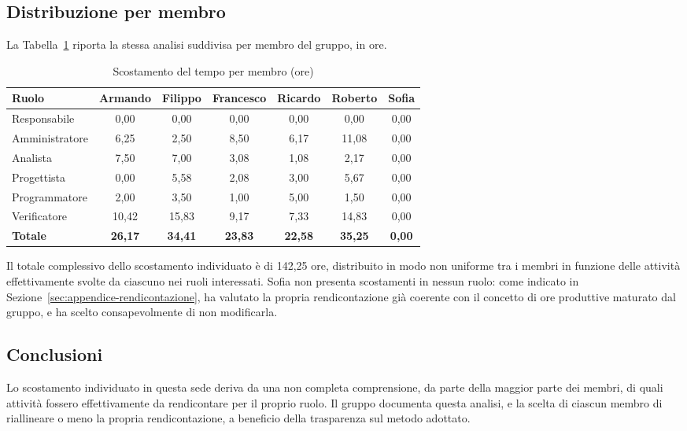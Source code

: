 \subsection{Distribuzione per membro}

La Tabella~\ref{tab:appendice-delta-membro} riporta la stessa analisi
suddivisa per membro del gruppo, in ore.

\begin{table}[H]
\centering
\renewcommand{\arraystretch}{1.3}
\begin{tabularx}{\textwidth}{|X|c|c|c|c|c|c|}
\hline
\textbf{Ruolo} & \textbf{Armando} & \textbf{Filippo} & \textbf{Francesco} & \textbf{Ricardo} & \textbf{Roberto} & \textbf{Sofia} \\
\hline
Responsabile   & 0{,}00 & 0{,}00 & 0{,}00 & 0{,}00 & 0{,}00 & 0{,}00 \\
Amministratore & 6{,}25 & 2{,}50 & 8{,}50 & 6{,}17 & 11{,}08 & 0{,}00 \\
Analista       & 7{,}50 & 7{,}00 & 3{,}08 & 1{,}08 & 2{,}17 & 0{,}00 \\
Progettista    & 0{,}00 & 5{,}58 & 2{,}08 & 3{,}00 & 5{,}67 & 0{,}00 \\
Programmatore  & 2{,}00 & 3{,}50 & 1{,}00 & 5{,}00 & 1{,}50 & 0{,}00 \\
Verificatore   & 10{,}42 & 15{,}83 & 9{,}17 & 7{,}33 & 14{,}83 & 0{,}00 \\
\hline
\textbf{Totale} & \textbf{26{,}17} & \textbf{34{,}41} & \textbf{23{,}83} & \textbf{22{,}58} & \textbf{35{,}25} & \textbf{0{,}00} \\
\hline
\end{tabularx}
\caption{Scostamento del tempo per membro (ore)}
\label{tab:appendice-delta-membro}
\end{table}

Il totale complessivo dello scostamento individuato è di 142{,}25 ore, 
distribuito in modo non uniforme tra i membri in funzione
delle attività effettivamente svolte da ciascuno nei ruoli interessati.
Sofia non presenta scostamenti in nessun ruolo: come indicato in
Sezione~\ref{sec:appendice-rendicontazione}, ha valutato la propria
rendicontazione già coerente con il concetto di ore produttive maturato
dal gruppo, e ha scelto consapevolmente di non modificarla.

\subsection{Conclusioni}

Lo scostamento individuato in questa sede deriva da una non completa comprensione, 
da parte della maggior parte dei membri, di quali attività fossero effettivamente 
da rendicontare per il proprio ruolo. Il gruppo documenta questa
analisi, e la scelta di ciascun membro di riallineare o meno la propria
rendicontazione, a beneficio della trasparenza sul metodo adottato.